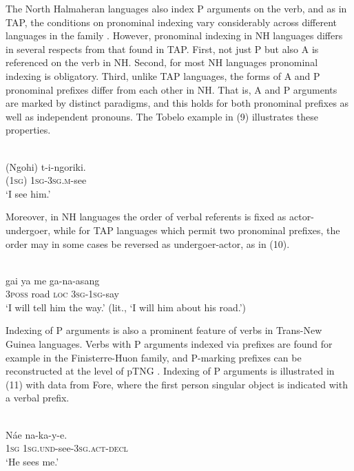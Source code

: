 The North Halmaheran languages also index P arguments on the verb, and as in TAP, the conditions on pronominal indexing vary considerably across different languages in the family \citep{Holton2008}. However, pronominal indexing in NH languages differs in several respects from that found in TAP. First, not just P but also A is referenced on the verb in NH. Second, for most NH languages pronominal indexing is obligatory. Third, unlike TAP languages, the forms of A and P pronominal prefixes differ from each other in NH. That is, A and P arguments are marked by distinct paradigms, and this holds for both pronominal prefixes as well as independent pronouns. The Tobelo example in (9) illustrates these properties.

\ea%
 \\
\gll  (Ngohi) t-i-ngoriki. \\
    (\textsc{1sg}) \textsc{1sg-3sg.m}-see\\
\glt `I see him.'
\z





Moreover, in NH languages the order of verbal referents is fixed as actor-undergoer, while for TAP languages which permit two pronominal prefixes, the order may in some cases be reversed as undergoer-actor, as in (10).

\ea%
 \\
\gll  gai ya me ga-na-asang \\
 \textsc{3poss} road \textsc{loc} \textsc{3sg-1sg}-say  \\
\glt `I will tell him the way.' (lit., `I will him about his road.')
\z

 



Indexing of P arguments is also a prominent feature of verbs in Trans-New Guinea languages. Verbs with P arguments indexed via prefixes are found for example in the Finisterre-Huon family, and P-marking prefixes can be reconstructed at the level of pTNG \citep{Suter2012}. Indexing of P arguments is illustrated in (11) with data from Fore, where the first person singular object is indicated with a verbal prefix.

\ea%
 \\
\gll  N\'ae na-ka-y-e. \\
  1\textsc{sg} \textsc{1sg.und}-see-\textsc{3sg.act-decl}  \\
\glt `He sees me.'
\z





